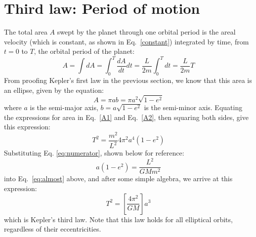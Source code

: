 \documentclass[11pt]{article}
\begin{document}
\section{Third law: Period of motion}
The total area $A$ swept by the planet through one orbital period is the areal
velocity (which is constant, as shown in Eq.\ \ref{constant}) integrated by
time, from $t=0$ to $T$, the orbital period of the planet:
\begin{equation}
  A=\int dA=\int_0^T\frac{dA}{dt}dt=\frac{L}{2m}\int_0^Tdt=\frac{L}{2m}T
  \label{A1}
\end{equation}
From proofing Kepler's first law in the previous section, we know that this
area is an ellipse, given by the equation:
\begin{equation}
  A=\pi ab=\pi a^2\sqrt{1-e^2}
  \label{A2}
\end{equation}
where $a$ is the semi-major axis, $b=a\sqrt{1-e^2}$ is the semi-minor axis.
Equating the expressions for area in Eq.\ \ref{A1} and Eq.\ \ref{A2}, then
squaring both sides, give this expression:
\begin{equation}
  T^2=\frac{m^2}{L^2}4\pi^2a^4(1-e^2)
  \label{eq:almost}
\end{equation}
Substituting Eq. \ref{eq:numerator}, shown below for reference:
\begin{displaymath}
  a(1-e^2)=\frac{L^2}{GMm^2}
\end{displaymath}
into Eq.\ \ref{eq:almost} above, and after some simple algebra, we arrive at
this expression:
\begin{equation}
  \boxed{T^2=\left[\frac{4\pi^2}{GM}\right] a^3}
\end{equation}
which is Kepler's third law. Note that this law holds for all elliptical
orbits, regardless of their eccentricities.
\end{document}
